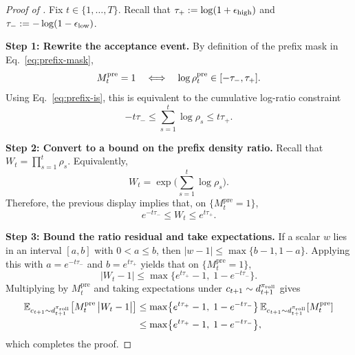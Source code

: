 \begin{proof}[Proof of ]
Fix $t\in\{1,\ldots,T\}$. Recall that $\tau_+ := \log(1+\epsilon_{\mathrm{high}})$ and $\tau_- := -\log(1-\epsilon_{\mathrm{low}})$.

\smallskip
\noindent\textbf{Step 1: Rewrite the acceptance event.}
By definition of the prefix mask in Eq.~\eqref{eq:prefix-mask},
\begin{equation*}
    M_t^{\mathrm{pre}}=1
    \quad\Longleftrightarrow\quad
    \log\rho_{t}^{\mathrm{pre}}\in[-\tau_-,\tau_+].
\end{equation*}
Using Eq.~\eqref{eq:prefix-is}, this is equivalent to the cumulative log-ratio constraint
\begin{equation*}
    -t\tau_- \le \sum_{s=1}^{t}\log\rho_s \le t\tau_+.
\end{equation*}

\smallskip
\noindent\textbf{Step 2: Convert to a bound on the prefix density ratio.}
Recall that $W_t = \prod_{s=1}^{t}\rho_s$. Equivalently,
\begin{equation*}
    W_t = \exp\!\Big(\sum_{s=1}^{t}\log\rho_s\Big).
\end{equation*}
Therefore, the previous display implies that, on $\{M_t^{\mathrm{pre}}=1\}$,
\begin{equation*}
    e^{-t\tau_-} \le W_t \le e^{t\tau_+}.
\end{equation*}

\smallskip
\noindent\textbf{Step 3: Bound the ratio residual and take expectations.}
If a scalar $w$ lies in an interval $[a,b]$ with $0<a\le b$, then $|w-1|\le \max\{b-1,1-a\}$. Applying this with
$a=e^{-t\tau_-}$ and $b=e^{t\tau_+}$ yields that on $\{M_t^{\mathrm{pre}}=1\}$,
\begin{equation*}
    \bigl|W_t-1\bigr|
    \le
    \max\!\big\{e^{t\tau_+}-1,\;1-e^{-t\tau_-}\big\}.
\end{equation*}
Multiplying by $M_t^{\mathrm{pre}}$ and taking expectations under $c_{t+1}\sim d_{t+1}^{\pi_{\mathrm{roll}}}$ gives
\begin{align*}
    \mathbb{E}_{c_{t+1}\sim d_{t+1}^{\pi_{\mathrm{roll}}}}\!\left[M_t^{\mathrm{pre}}\,\bigl|W_t-1\bigr|\right]
    &\le
    \max\!\big\{e^{t\tau_+}-1,\;1-e^{-t\tau_-}\big\}\,
    \mathbb{E}_{c_{t+1}\sim d_{t+1}^{\pi_{\mathrm{roll}}}}\!\left[M_t^{\mathrm{pre}}\right]
    \\
    &\le
    \max\!\big\{e^{t\tau_+}-1,\;1-e^{-t\tau_-}\big\},
\end{align*}
which completes the proof.
\end{proof}

